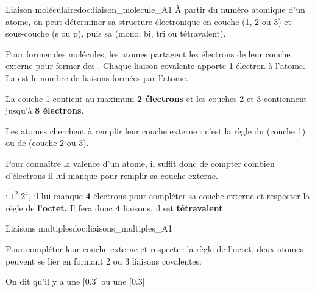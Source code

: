 \begin{doc}{Liaison moléculaire}{doc:liaison_molecule_A1}
  À partir du numéro atomique d'un atome, on peut déterminer sa structure électronique en couche (1, 2 ou 3) et sous-couche (s ou p), puis sa  (mono, bi, tri ou tétravalent).
  \begin{importants}
    Pour former des molécules, les atomes partagent les électrons de leur couche externe pour former des .
    Chaque liaison covalente apporte 1 électron à l'atome.
    La  est le nombre de liaisons formées par l'atome.
  \end{importants}
  \begin{importants}
    La couche 1 contient au maximum \textbf{2 électrons} et les couches 2 et 3 contiennent jusqu'à \textbf{8 électrons}.

    Les atomes cherchent à remplir leur couche externe : c'est la règle du  (couche 1) ou de  (couche 2 ou 3).
  \end{importants}
  Pour connaître la valence d'un atome, il suffit donc de compter combien d'électrons il lui manque pour remplir sa couche externe.

  \exemple {} : $1^2\; 2^4$,
  il lui manque \textbf{4} électrons pour compléter sa couche externe et respecter la règle de \textbf{l'octet.}
  Il fera donc \textbf{4} liaisons, il est \textbf{tétravalent}.
\end{doc}



%
\newpage
\vspace*{-30pt}


\begin{doc}{Liaisons multiples}{doc:liaisons_multiples_A1}
  \begin{importants}
    Pour compléter leur couche externe et respecter la règle de l'octet, deux atomes peuvent se lier en formant 2 ou 3 liaisons covalentes.
    
    On dit qu'il y a une [0.3] ou une [0.3]
  \end{importants}
\end{doc}

